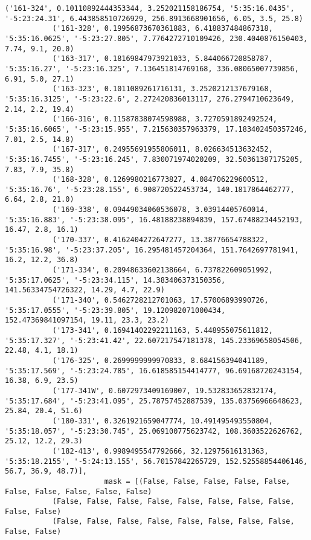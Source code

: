 \documentclass{article}
\begin{document}
\begin{Verbatim}[commandchars=\\\{\}]
           ('161-324', 0.10110892444353344, 3.252021158186754, '5:35:16.0435', '-5:23:24.31', 6.443858510726929, 256.8913668901656, 6.05, 3.5, 25.8)
           ('161-328', 0.19956873670361883, 6.418837484867318, '5:35:16.0625', '-5:23:27.805', 7.7764272710109426, 230.4040876150403, 7.74, 9.1, 20.0)
           ('163-317', 0.18169847973921033, 5.844066720858787, '5:35:16.27', '-5:23:16.325', 7.136451814769168, 336.08065007739856, 6.91, 5.0, 27.1)
           ('163-323', 0.1011089261716131, 3.2520212137679168, '5:35:16.3125', '-5:23:22.6', 2.272420836013117, 276.2794710623649, 2.14, 2.2, 19.4)
           ('166-316', 0.11587838074598988, 3.7270591892492524, '5:35:16.6065', '-5:23:15.955', 7.215630357963379, 17.183402450357246, 7.01, 2.5, 14.8)
           ('167-317', 0.24955691955806011, 8.026634513632452, '5:35:16.7455', '-5:23:16.245', 7.830071974020209, 32.50361387175205, 7.83, 7.9, 35.8)
           ('168-328', 0.1269980216773827, 4.084706229600512, '5:35:16.76', '-5:23:28.155', 6.908720522453734, 140.1817864462777, 6.64, 2.8, 21.0)
           ('169-338', 0.09449034060536078, 3.03914405760014, '5:35:16.883', '-5:23:38.095', 16.48188238894839, 157.67488234452193, 16.47, 2.8, 16.1)
           ('170-337', 0.4162404272647277, 13.38776654788322, '5:35:16.98', '-5:23:37.205', 16.295481457204364, 151.7642697781941, 16.2, 12.2, 36.8)
           ('171-334', 0.20948633602138664, 6.737822609051992, '5:35:17.0625', '-5:23:34.115', 14.383406373150356, 141.56334754726322, 14.29, 4.7, 22.9)
           ('171-340', 0.5462728212701063, 17.57006893990726, '5:35:17.0555', '-5:23:39.805', 19.120982071000434, 152.47369841097154, 19.11, 23.3, 23.2)
           ('173-341', 0.16941402292211163, 5.448955075611812, '5:35:17.327', '-5:23:41.42', 22.607217547181378, 145.23369658054506, 22.48, 4.1, 18.1)
           ('176-325', 0.2699999999970833, 8.684156394041189, '5:35:17.569', '-5:23:24.785', 16.618585154414777, 96.69168720243154, 16.38, 6.9, 23.5)
           ('177-341W', 0.6072973409169007, 19.532833652832174, '5:35:17.684', '-5:23:41.095', 25.78757452887539, 135.03756966648623, 25.84, 20.4, 51.6)
           ('180-331', 0.3261921659047774, 10.491495493550804, '5:35:18.057', '-5:23:30.745', 25.069100775623742, 108.3603522626762, 25.12, 12.2, 29.3)
           ('182-413', 0.9989495547792666, 32.12975616131363, '5:35:18.2155', '-5:24:13.155', 56.70157842265729, 152.52558854406146, 56.7, 36.9, 48.7)],
                       mask = [(False, False, False, False, False, False, False, False, False, False)
           (False, False, False, False, False, False, False, False, False, False)
           (False, False, False, False, False, False, False, False, False, False)

\end{Verbatim}
\end{document}
